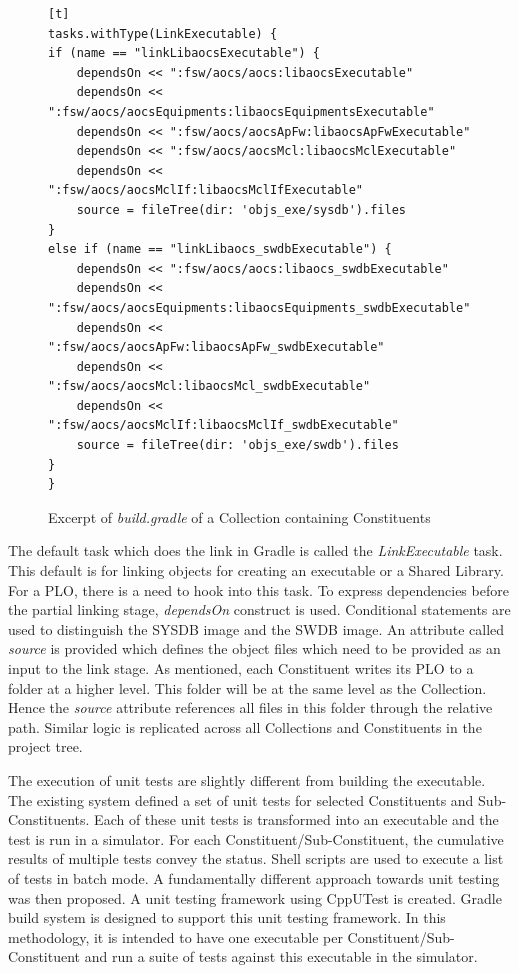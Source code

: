 \documentclass[12pt, a4paper, titlepage]{scrartcl}
\newcommand{\courierword}[1]{\textsf{\itshape #1}}{\fontfamily{pcr}\selectfont}%
\begin{document}
\begin{figure}[!ht]
\begin{lstlisting}[frame=single][t]
tasks.withType(LinkExecutable) {
if (name == "linkLibaocsExecutable") {
	dependsOn << ":fsw/aocs/aocs:libaocsExecutable"
	dependsOn << ":fsw/aocs/aocsEquipments:libaocsEquipmentsExecutable"
	dependsOn << ":fsw/aocs/aocsApFw:libaocsApFwExecutable"
	dependsOn << ":fsw/aocs/aocsMcl:libaocsMclExecutable"				
	dependsOn << ":fsw/aocs/aocsMclIf:libaocsMclIfExecutable"
	source = fileTree(dir: 'objs_exe/sysdb').files				
}
else if (name == "linkLibaocs_swdbExecutable") {
	dependsOn << ":fsw/aocs/aocs:libaocs_swdbExecutable"
	dependsOn << ":fsw/aocs/aocsEquipments:libaocsEquipments_swdbExecutable"
	dependsOn << ":fsw/aocs/aocsApFw:libaocsApFw_swdbExecutable"
	dependsOn << ":fsw/aocs/aocsMcl:libaocsMcl_swdbExecutable"				
	dependsOn << ":fsw/aocs/aocsMclIf:libaocsMclIf_swdbExecutable"
	source = fileTree(dir: 'objs_exe/swdb').files
}
}
\end{lstlisting}
\caption{Excerpt of \courierword{build.gradle} of a Collection containing Constituents}
\label{fig:collection-with-constituent}
\end{figure}
\par The default task which does the link in Gradle is called the \emph{LinkExecutable} task. This default is for linking objects for creating an executable or a Shared Library. For a PLO, there is a need to hook into this task. To express dependencies before the partial linking stage, \emph{dependsOn} construct is used. Conditional statements are used to distinguish the SYSDB image and the SWDB image. An attribute called \emph{source} is provided which defines the object files which need to be provided as an input to the link stage. As mentioned, each Constituent writes its PLO to a folder at a higher level. This folder will be at the same level as the Collection. Hence the \emph{source} attribute references all files in this folder through the relative path. Similar logic is replicated across all Collections and Constituents in the project tree. 
\par The execution of unit tests are slightly different from building the executable. The existing system defined a set of unit tests for selected Constituents and Sub-Constituents. Each of these unit tests is transformed into an executable and the test is run in a simulator. For each Constituent/Sub-Constituent, the cumulative results of multiple tests convey the status. Shell scripts are used to execute a list of tests in batch mode. A fundamentally different approach towards unit testing was then proposed. A unit testing framework using CppUTest is created. Gradle build system is designed to support this unit testing framework. In this methodology, it is intended to have one executable per Constituent/Sub-Constituent and run a suite of tests against this executable in the simulator. 
\end{document}
